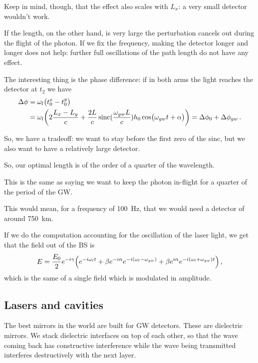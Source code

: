 \documentclass[main.tex]{subfiles}
\begin{document}
Keep in mind, though, that the effect also scales with \(L_x\): a very small detector wouldn't work. 

If the length, on the other hand, is very large the perturbation cancels out during the flight of the photon.  
If we fix the frequency, making the detector longer and longer does not help: further full oscillations of the path length do not have any effect.

The interesting thing is the phase difference: if in both arms the light reaches the detector at \(t_2 \) we have 
%
\begin{subequations}
\begin{align}
\Delta \phi 
&= \omega_{l} \qty(t_0^{x }- t_0^{y}) \\
&= \omega_{l} \qty(2 \frac{L_x -L_y}{c} + \frac{2L}{c} \operatorname{sinc}(\frac{\omega_{gw} L}{c} ) h_0 \cos(\omega_{gw} t + \alpha )) = \Delta \phi_0 + \Delta \phi_{gw}
\,.
\end{align}
\end{subequations}

So, we have a tradeoff: we want to stay before the first zero of the sinc, but we also want to have a relatively large detector.

So, our optimal length is of the order of a quarter of the wavelength.

This is the same as saying we want to keep the photon in-flight for a quarter of the period of the GW. 

This would mean, for a frequency of \SI{100}{Hz}, that we would need a detector of around \SI{750}{km}.

If we do the computation accounting for the oscillation of the laser light, we get that the field out of the BS is 
%
\begin{align}
E = \frac{E_0}{2} e^{-i \gamma } \qty(e^{-i \omega_{l} t}
+ \beta e^{-i \alpha } e^{-i (\omega_{l} - \omega_{gw})} + \beta e^{i \alpha } e^{-i (\omega_{l} + \omega_{gw}) t})
\,,
\end{align}
%
which is the same of a single field which is modulated in amplitude.

\subsection{Lasers and cavities}

The best mirrors in the world are built for GW detectors.
These are dielectric mirrors.
We stack dielectric interfaces on top of each other, so that the wave coming back has constructive interference while the wave being transmitted interferes destructively with the next layer.
\end{document}
